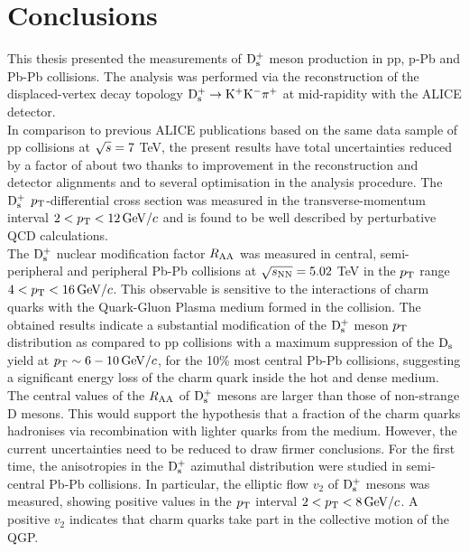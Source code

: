 \chapter{Conclusions}
\label{chap:conclusions}
This thesis presented the measurements of ${\rm D_s^+}$ meson production in pp, p-Pb and Pb-Pb collisions.
The analysis was performed via the reconstruction of the displaced-vertex decay topology ${\rm D^{+}_\mathrm{s}\to K^+ K^-\pi^+}$ at 
mid-rapidity with the ALICE detector. \\

In comparison to previous ALICE publications based on the same data sample of pp collisions at $\sqrt{s}=7$ TeV, the present
results have total uncertainties reduced by a factor of about two thanks to improvement
in the reconstruction and detector alignments and to several optimisation in the analysis procedure. The ${\rm D_s^+}$ $p_{\rm T}$-differential cross 
section was measured in the transverse-momentum interval $2<p_{\rm T}<12 \, \mathrm{GeV}/c$ and is found to 
be well described by perturbative QCD calculations.\\


The ${\rm D_s^+}$ nuclear modification factor $R_{\rm AA}$ was measured in central, semi-peripheral and peripheral Pb-Pb collisions at 
$\sqrt{s_{\rm NN}}=5.02$ TeV in the $p_{\rm T}$ range $4< p_{\rm T} <16 \, \mathrm{GeV}/c$. This observable is sensitive to the interactions of charm quarks 
with the Quark-Gluon Plasma medium formed in the collision. The obtained results indicate a
substantial modification of the ${\rm D_s^+}$ meson $p_{\rm T}$ distribution as compared to pp collisions
with a maximum suppression of the ${\rm D_s}$ yield at $p_{\rm T} \sim 6-10\, \mathrm{GeV}/c$, for the 10\% most central Pb-Pb collisions,
suggesting a significant energy loss of the charm quark inside the hot and dense medium.
The central values of the $R_{\rm AA}$ of ${\rm D_s^+}$ mesons are larger than those of non-strange D 
mesons. This would support the hypothesis that a fraction of the charm quarks hadronises via recombination 
with lighter quarks from the medium.
However, the current uncertainties need to be reduced to draw firmer conclusions.
For the first time, the anisotropies in the ${\rm D_s^+}$ azimuthal distribution were studied in semi-central Pb-Pb collisions.
In particular, the elliptic flow $v_2$ of ${\rm D_s^+}$ mesons was measured, showing positive values in the 
$p_{\rm T}$ interval $2 <p_{\rm T} <8 \, \mathrm{GeV}/c$.
A positive $v_2$ indicates that charm quarks take part in the collective motion of the QGP.\\

